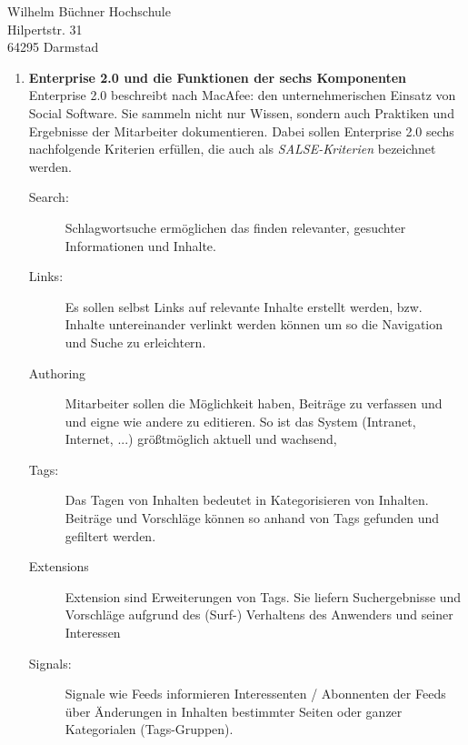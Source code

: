 \documentclass[
    version=last,           %
    DIV=13,                 %
    BCOR=0mm,               %
    paper=a4,               %
    fontsize=12pt,          %
    firsthead=on,           %
    firstfoot=on,           %
    pagenumber=on,i         %
    parskip=half,           %
    enlargefirstpage=,      %
    firsthead=on,           %
    fromrule=afteraddress,  %
    priority=off,           %
    backaddress=true,       %
    refline=dateright,      %
	fromalign=right,	    %
    fromemail=on,i          %
    fromurl=on,             %
    frombank=on,
    fromphone=on,           %
    frommobilephone=on      %
    fromlogo=on,            %
    addrfield=on,           %
    subject=untitled,  %
    foldmarks=off,          %
    numericaldate=off,      %
	pagenumber=right,	        %
	parskip=half,	        %
    headsep=false,          %
    footsepline=true,       %
    foldmarks=off,		    %
	]{scrlttr2}
\begin{document}
\begin{letter} {Wilhelm Büchner Hochschule \\
Hilpertstr. 31\\
64295 Darmstad}
\begin{itemize}
\begin{enumerate}
        Bei der Rückwärtsinterpretation ist die Arbeitsaufgabe (W) Ausgangspunkt,
        welche kooperativ und arbeitsteilig durchgeführt wird (C) und
        Unterstützung durch Technologie erfährt (C). Der Fokus liegt auf der
        Aufgabe, nicht auf der eingesetzten Technologie. \\

        Das 3-K Modell beschreibt dabei die Art der unterstützten Interaktion
        zwischen den Teammitgliedern durch die Technik (C) und kann auf Basis
        von Kommunikation, Koordination oder Kooperation erfolgen. Die
        eingesetzten, unterstützenden Technologien lassen sich in Systemklassen
        einteilen; wie \textit{Kommunikation, gemeinsame Informationsräume,
        Workflow Management} oder \textit{Workgroup Computing}.
            \vspace{1cm}
        \item \textbf{Enterprise 2.0 und die Funktionen der sechs Komponenten}
            Enterprise 2.0 beschreibt nach MacAfee: den unternehmerischen
            Einsatz von Social Software. Sie sammeln nicht nur Wissen, sondern
            auch Praktiken und Ergebnisse der Mitarbeiter dokumentieren. Dabei
            sollen Enterprise 2.0 sechs nachfolgende Kriterien erfüllen, die
            auch als \textit{SALSE-Kriterien} bezeichnet werden.

            \begin{description}
            \item[Search:] Schlagwortsuche ermöglichen das finden relevanter,
                gesuchter Informationen und Inhalte.
            \item[Links:] Es sollen selbst Links auf relevante Inhalte erstellt
                werden, bzw. Inhalte untereinander verlinkt werden können um so
                die Navigation und Suche zu erleichtern.
                \item[Authoring] Mitarbeiter sollen die Möglichkeit haben, Beiträge
                    zu verfassen und und eigne wie andere zu editieren. So ist
                    das System (Intranet, Internet, ...) größtmöglich aktuell
                    und wachsend,
                \item[Tags:] Das Tagen von Inhalten bedeutet in Kategorisieren
                    von Inhalten. Beiträge und Vorschläge können so anhand von
                    Tags gefunden und gefiltert werden.
                \item[Extensions]
                    Extension sind Erweiterungen von Tags. Sie liefern
                    Suchergebnisse und Vorschläge aufgrund des (Surf-) Verhaltens
                    des Anwenders und seiner Interessen
                \item[Signals:] Signale wie Feeds informieren Interessenten /
                    Abonnenten der Feeds über Änderungen in Inhalten bestimmter
                    Seiten oder ganzer Kategorialen (Tags-Gruppen).
            \end{description}


\end{enumerate}
\end{itemize}
\end{letter}
\end{document}
